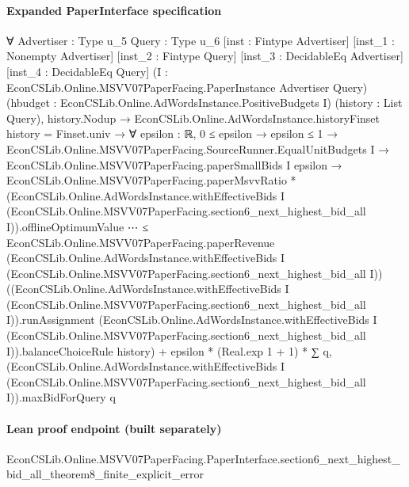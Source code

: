 \documentclass[10pt]{article}
\begin{document}
\paragraph{Expanded PaperInterface specification}
\begin{ReviewVerbatim}
∀ {Advertiser : Type u_5} {Query : Type u_6} [inst : Fintype Advertiser] [inst_1 : Nonempty Advertiser]
  [inst_2 : Fintype Query] [inst_3 : DecidableEq Advertiser] [inst_4 : DecidableEq Query]
  (I : EconCSLib.Online.MSVV07PaperFacing.PaperInstance Advertiser Query)
  (hbudget : EconCSLib.Online.AdWordsInstance.PositiveBudgets I) (history : List Query),
  history.Nodup →
    EconCSLib.Online.AdWordsInstance.historyFinset history = Finset.univ →
      ∀ {epsilon : ℝ},
        0 ≤ epsilon →
          epsilon ≤ 1 →
            EconCSLib.Online.MSVV07PaperFacing.SourceRunner.EqualUnitBudgets I →
              EconCSLib.Online.MSVV07PaperFacing.paperSmallBids I epsilon →
                EconCSLib.Online.MSVV07PaperFacing.paperMsvvRatio *
                    (EconCSLib.Online.AdWordsInstance.withEffectiveBids I
                          (EconCSLib.Online.MSVV07PaperFacing.section6_next_highest_bid_all I)).offlineOptimumValue
                      ⋯ ≤
                  EconCSLib.Online.MSVV07PaperFacing.paperRevenue
                      (EconCSLib.Online.AdWordsInstance.withEffectiveBids I
                        (EconCSLib.Online.MSVV07PaperFacing.section6_next_highest_bid_all I))
                      ((EconCSLib.Online.AdWordsInstance.withEffectiveBids I
                            (EconCSLib.Online.MSVV07PaperFacing.section6_next_highest_bid_all I)).runAssignment
                        (EconCSLib.Online.AdWordsInstance.withEffectiveBids I
                            (EconCSLib.Online.MSVV07PaperFacing.section6_next_highest_bid_all I)).balanceChoiceRule
                        history) +
                    epsilon * (Real.exp 1 + 1) *
                      ∑ q,
                        (EconCSLib.Online.AdWordsInstance.withEffectiveBids I
                              (EconCSLib.Online.MSVV07PaperFacing.section6_next_highest_bid_all I)).maxBidForQuery
                          q
\end{ReviewVerbatim}

\paragraph{Lean proof endpoint (built separately)}\begin{ReviewVerbatim}
EconCSLib.Online.MSVV07PaperFacing.PaperInterface.section6_next_highest_bid_all_theorem8_finite_explicit_error
\end{ReviewVerbatim}
\end{document}
